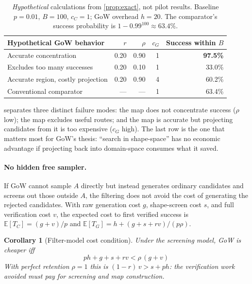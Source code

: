 \documentclass[11pt]{article}
\theoremstyle{gowthm}
\theoremstyle{gowplain}
\newtheorem{corollary}{Corollary}[section]
\begin{document}
\begin{table}[t]
\centering
\caption{\emph{Hypothetical} calculations from
\cref{prop:exact}, not pilot results. Baseline $p=0.01$, $B=100$, $c_C=1$;
GoW overhead $h=20$. The comparator's success probability is
$1-0.99^{100}\approx 63.4\%$.}
\label{tab:superiority-worked}
\small
\begin{tabular}{lrrrr}
\toprule
Hypothetical GoW behavior & $r$ & $\rho$ & $c_G$ & Success within $B$ \\
\midrule
Accurate concentration            & 0.20 & 0.90 & 1 & \textbf{97.5\%} \\
Excludes too many successes        & 0.20 & 0.10 & 1 & 33.0\% \\
Accurate region, costly projection & 0.20 & 0.90 & 4 & 60.2\% \\
Conventional comparator            & ---  & ---  & 1 & 63.4\% \\
\bottomrule
\end{tabular}
\end{table}

 separates three distinct failure modes: the map
does not concentrate success ($\rho$ low); the map excludes useful routes; and
the map is accurate but projecting candidates from it is too expensive ($c_G$
high). The last row is the one that matters most for GoW's thesis: ``search in
shape-space'' has no economic advantage if projecting back into domain-space
consumes what it saved.

\paragraph{No hidden free sampler.}
If GoW cannot sample $A$ directly but instead generates ordinary candidates and
screens out those outside $A$, the filtering does not avoid the cost of
generating the rejected candidates. With raw generation cost $g$, shape-screen
cost $s$, and full verification cost $v$, the expected cost to first verified
success is $\mathbb{E}[T_C] = (g+v)/p$ and $\mathbb{E}[T_G] = h + (g+s+rv)/(p\rho)$.

\begin{corollary}[Filter-model cost condition]
\label{cor:filter}
Under the screening model, GoW is cheaper iff
\[
  \boxed{\;p h + g + s + r v < \rho\,(g + v)\;}
\]
With perfect retention $\rho = 1$ this is $(1-r)\,v > s + p h$: the verification
work \emph{avoided} must pay for screening and map construction.
\end{corollary}
\end{document}
